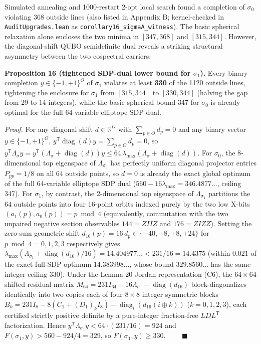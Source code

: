 \documentclass[11pt,a4paper]{article}
\newcommand{\lt}{<}
\newcommand{\gt}{>}
\begin{document}
Simulated annealing and 1000-restart 2-opt local search found a completion of \(\sigma_0\) violating 368
outside lines (also listed in Appendix B; kernel-checked in \nolinkurl{AuditUpgrades.lean} as
\nolinkurl{corollary16_sigmaA_witness}). The basic spherical relaxation alone encloses the two minima in
\([347,368]\) and \([315,344]\). However, the diagonal-shift QUBO semidefinite dual reveals a striking
structural asymmetry between the two cospectral carriers:

\textbf{Proposition 16\textquotesingle{} (tightened SDP-dual lower bound for \(\sigma_1\)).} Every binary completion
\(y\in\{-1,+1\}^O\) of \(\sigma_1\) violates at least \textbf{330} of the 1120 outside lines, tightening the
enclosure for \(\sigma_1\) from \([315,344]\) to \textbf{\([330,344]\)} (halving the gap from 29 to 14 integers),
while the basic spherical bound 347 for \(\sigma_0\) is already optimal for the full 64-variable
elliptope SDP dual.

\emph{Proof.} For any diagonal shift \(d\in\mathbb R^O\) with \(\sum_{p\in O} d_p = 0\) and any binary vector
\(y\in\{-1,+1\}^O\), \(y^{\mathsf T}\operatorname{diag}(d)y = \sum_{p\in O} d_p = 0\), so
\(y^{\mathsf T}\Lambda_\sigma y = y^{\mathsf T}(\Lambda_\sigma + \operatorname{diag}(d))y \le 64\,\lambda_{\max}(\Lambda_\sigma + \operatorname{diag}(d))\).
For \(\sigma_0\), the 8-dimensional top eigenspace of \(\Lambda_{\sigma_0}\) has perfectly uniform diagonal
projector entries \(P_{pp} = 1/8\) on all 64 outside points, so \(d=0\) is already the exact global optimum of
the full 64-variable elliptope SDP dual (\(560 - 16\lambda_{\max} = 346.4877\ldots\), ceiling 347). For
\(\sigma_1\), by contrast, the 2-dimensional top eigenspace of \(\Lambda_{\sigma_1}\) partitions the 64
outside points into four 16-point orbits indexed purely by the two low X-bits
\((a_1(p), a_0(p)) = p \bmod 4\) (equivalently, commutation with the two unpaired negative section
observables \(144 = ZIIZ\) and \(176 = ZIZZ\)). Setting the zero-sum geometric shift
\(d_{16}(p) = 16\,d_p \in \{-40, +8, +8, +24\}\) for \(p \bmod 4 = 0, 1, 2, 3\) respectively gives
\(\lambda_{\max}(\Lambda_{\sigma_1} + \operatorname{diag}(d_{16})/16) = 14.404977\ldots \lt 231/16 = 14.4375\)
(within \(0.021\) of the exact full-SDP optimum \(14.383998\ldots\), whose bound \(329.8560\ldots\) has the
same integer ceiling 330). Under the Lemma 20 Jordan representation (C6), the \(64\times 64\) shifted
residual matrix \(M_{64} = 231 I_{64} - 16\Lambda_{\sigma_1} - \operatorname{diag}(d_{16})\)
block-diagonalizes identically into two copies each of four \(8\times 8\) integer symmetric blocks
\(B_k = 231 I_8 - 8(C_1 + (D_1)_k I_8) - \operatorname{diag}_i(d_{16}(i \oplus k))\) (\(k=0,1,2,3\)), each
certified strictly positive definite by a pure-integer fraction-free \(LDL^{\mathsf T}\) factorization.
Hence \(y^{\mathsf T}\Lambda_{\sigma_1}y \lt 64 \cdot (231/16) = 924\) and
\(F(\sigma_1,y) \gt 560 - 924/4 = 329\), so \(F(\sigma_1,y) \ge 330\). \(\qquad\blacksquare\)
\end{document}
